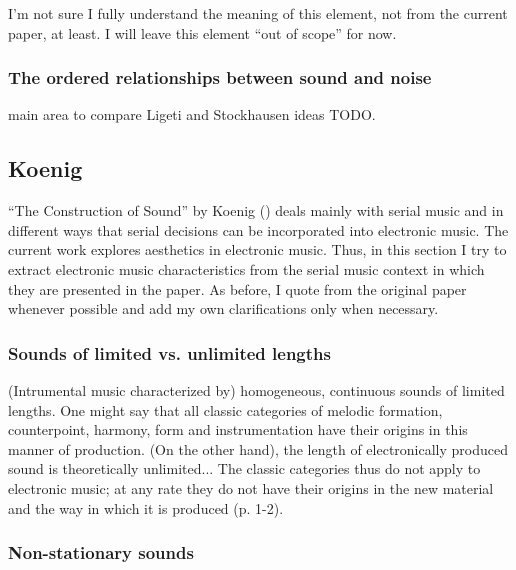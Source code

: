 \documentclass[a4paper,11pt]{article}
\newenvironment{MyShadequote}[1][]{%
    \ignorespaces%
    \begin{mdframed}[style=MyShadeQuoteStyle,#1]%
}{%
    \end{mdframed}%
    \ignorespacesafterend%
}%
\begin{document}
I'm not sure I fully understand the meaning of this element, not from the current paper, at least.
I will leave this element ``out of scope'' for now.

\subsubsection{The ordered relationships between sound and noise}
\label{subs:stockhausen:noise}

main area to compare Ligeti and Stockhausen ideas TODO.

\subsection{Koenig}
\label{sub:eshtetic_koenig}

``The Construction of Sound'' by Koenig (\cite*{koenig}) deals mainly with serial music and in different ways that serial decisions can be incorporated into electronic music.
The current work explores aesthetics in electronic music.
Thus, in this section I try to extract electronic music characteristics from the serial music context in which they are presented in the paper.
As before, I quote from the original paper whenever possible and add my own clarifications only when necessary.

\subsubsection{Sounds of limited vs. unlimited lengths}
\label{subs:koenig:lengths}

\begin{MyShadequote}
  (Intrumental music characterized by) homogeneous, continuous sounds of limited lengths.
  One might say that all classic categories of melodic formation, counterpoint, harmony, form and instrumentation have their origins in this manner of production.
  (On the other hand), the length of electronically produced sound is theoretically unlimited...
  The classic categories thus do not apply to electronic music;
  at any rate they do not have their origins in the new material and the way in which it is produced (p. 1-2).
\end{MyShadequote}

\subsubsection{Non-stationary sounds}
\label{subs:koenig:nonstationary}
\end{document}

